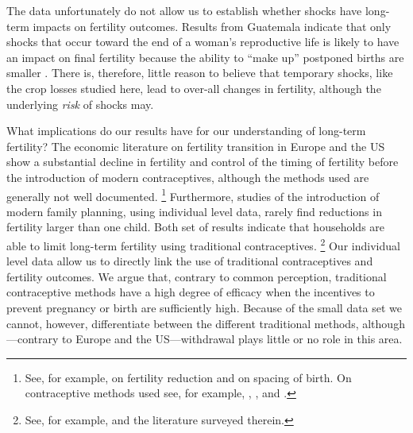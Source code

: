 \documentclass[letterpaper,12pt]{article}
\begin{document}
The data unfortunately do not allow us to establish whether shocks
have long-term impacts on fertility outcomes.
Results from Guatemala indicate that only shocks that occur 
toward the end of a woman's reproductive life is likely to have an 
impact on final fertility because the ability to ``make up'' 
postponed births are smaller \citep{Portner2014}.
There is, therefore, little reason to believe that temporary shocks,
like the crop losses studied here, lead to over-all changes in fertility,
although the underlying \emph{risk} of shocks may. 


What implications do our results have for our understanding of 
long-term fertility?
The economic literature on fertility transition in Europe and the US 
show a substantial decline in fertility and control of the timing of 
fertility before the introduction of modern contraceptives, although 
the methods used are generally not well documented.%
\footnote{
See, for example, \citet{Guinnane2011} on fertility reduction and 
\citet{Cinnirella2017} on spacing of birth.
On contraceptive methods used see, for example, \citet{Michael1976},
\citet{David1986}, and \citet{Santow1995}.
}
Furthermore, studies of the introduction of modern family planning, 
using individual level data, rarely find reductions in fertility larger 
than one child.
Both set of results indicate that households are able to 
limit long-term fertility using traditional contraceptives.%
\footnote{
See, for example, \cite{Portner2014a} and the literature surveyed therein.
}
Our individual level data allow us to directly link the use of
traditional contraceptives and fertility outcomes.
We argue that, contrary to common perception, traditional
contraceptive methods have a high degree of efficacy when the
incentives to prevent pregnancy or birth are sufficiently high.
Because of the small data set we cannot, however, differentiate between
the different traditional methods, although---contrary to Europe 
and the US---withdrawal plays little or no role in this area.
\end{document}
